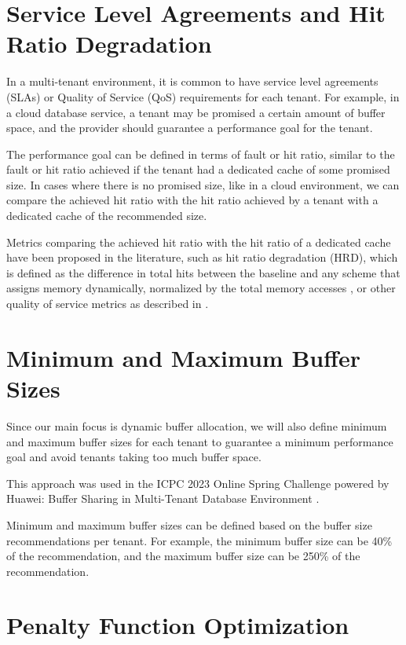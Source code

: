 \section{Service Level Agreements and Hit Ratio Degradation}

In a multi-tenant environment, it is common to have service level agreements (SLAs) or Quality 
of Service (QoS) requirements for each tenant. For example, in a cloud database service, a 
tenant may be promised a certain amount of buffer space, and the provider should guarantee a 
performance goal for the tenant.

The performance goal can be defined in terms of fault or hit ratio, similar to the fault or hit 
ratio achieved if the tenant had a dedicated cache of some promised size. In cases where there 
is no promised size, like in a cloud environment, we can compare the achieved hit ratio with 
the hit ratio achieved by a tenant with a dedicated cache of the recommended size.

Metrics comparing the achieved hit ratio with the hit ratio of a dedicated cache have been 
proposed in the literature, such as hit ratio degradation (HRD), which is defined as the 
difference in total hits between the baseline and any scheme that assigns memory dynamically, 
normalized by the total memory accesses \cite{buffer-sharing-1}, or other quality of service 
metrics as described in \cite{learning-based-prediction}.

\section{Minimum and Maximum Buffer Sizes}

Since our main focus is dynamic buffer allocation, we will also define minimum and maximum buffer 
sizes for each tenant to guarantee a minimum performance goal and avoid tenants taking too much 
buffer space.

This approach was used in the ICPC 2023 Online Spring Challenge powered by Huawei: Buffer Sharing 
in Multi-Tenant Database Environment \cite{huawei-challenge}.

Minimum and maximum buffer sizes can be defined based on the buffer size recommendations per 
tenant. For example, the minimum buffer size can be 40\% of the recommendation, and the maximum 
buffer size can be 250\% of the recommendation.

\newpage

\section{Penalty Function Optimization}

